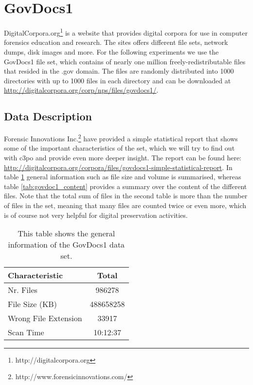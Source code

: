 
\section{GovDocs1}
DigitalCorpora.org\footnote{http://digitalcorpora.org} is a website that provides digital corpora for use in computer forensics education and research. The sites offers different file sets, network dumps, disk images and more. For the following experiments we use the GovDocs1 file set, which contains of nearly one million freely-redistributable files that resided in the .gov domain.
The files are randomly distributed into 1000 directories with up to 1000 files in each directory and can be downloaded at \url{http://digitalcorpora.org/corp/nps/files/govdocs1/}.

\subsection{Data Description}
Forensic Innovations Inc.\footnote{http://www.forensicinnovations.com/} have provided a simple statistical report that shows some of the important characteristics of the set, which we will try to find out with c3po and provide even more deeper insight. The report can be found here: \url{http://digitalcorpora.org/corpora/files/govdocs1-simple-statistical-report}. In table \ref{tab:govdoc1_general_info} general information such as file size and volume is summarised, whereas table \ref{tab:govdoc1_content} provides a summary over the content of the different files. Note that the total sum of files in the second table is more than the number of files in the set, meaning that many files are counted twice or even more, which is of course not very helpful for digital preservation activities.

\begin{table}
\centering
\begin{tabular}{l || c }
\hline
Characteristic & Total \\
\hline
\hline
Nr. Files & 986278 \\
File Size (KB) & 488658258 \\
Wrong File Extension & 33917 \\
Scan Time & 10:12:37 \\
\hline
\end{tabular}
\caption{This table shows the general information of the GovDocs1 data set.}
\label{tab:govdoc1_general_info}
\end{table}

